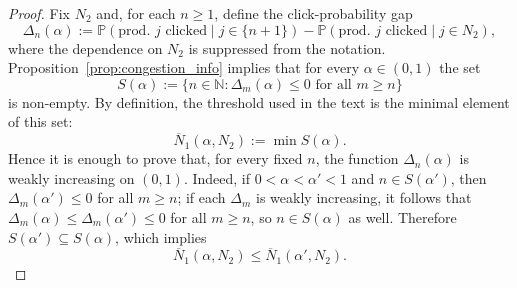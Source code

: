 \begin{proof}
Fix $N_2$ and, for each $n \geq 1$, define the click-probability gap
\begin{equation*}
    \Delta_n(\alpha) := \mathbb{P}(\text{prod.\ } j \text{ clicked} \mid j \in \{n+1\}) - \mathbb{P}(\text{prod.\ } j \text{ clicked} \mid j \in N_2),
\end{equation*}
where the dependence on $N_2$ is suppressed from the notation. Proposition~\ref{prop:congestion_info} implies that for every $\alpha \in (0,1)$ the set
\begin{equation*}
    S(\alpha) := \{n \in \mathbb{N} : \Delta_m(\alpha) \leq 0 \text{ for all } m \geq n\}
\end{equation*}
is non-empty. By definition, the threshold used in the text is the minimal element of this set:
\begin{equation*}
    \overline{N}_1(\alpha, N_2) := \min S(\alpha).
\end{equation*}
Hence it is enough to prove that, for every fixed $n$, the function $\Delta_n(\alpha)$ is weakly increasing on $(0,1)$. Indeed, if $0 < \alpha < \alpha' < 1$ and $n \in S(\alpha')$, then $\Delta_m(\alpha') \leq 0$ for all $m \geq n$; if each $\Delta_m$ is weakly increasing, it follows that $\Delta_m(\alpha) \leq \Delta_m(\alpha') \leq 0$ for all $m \geq n$, so $n \in S(\alpha)$ as well. Therefore $S(\alpha') \subseteq S(\alpha)$, which implies
\begin{equation*}
    \overline{N}_1(\alpha, N_2) \leq \overline{N}_1(\alpha', N_2).
\end{equation*}


\end{proof}
